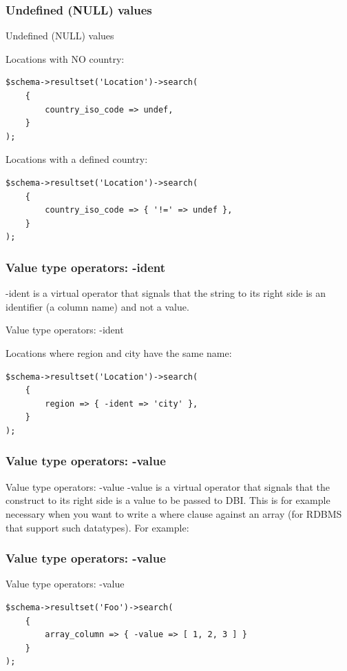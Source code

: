 \subsubsection{Undefined (NULL) values}
\begin{frame}[fragile]{Undefined (NULL) values}

Locations with NO country:

\begin{lstlisting}
$schema->resultset('Location')->search(
    {
        country_iso_code => undef,
    }
);
\end{lstlisting}

Locations with a defined country:

\begin{lstlisting}
$schema->resultset('Location')->search(
    {
        country_iso_code => { '!=' => undef },
    }
);
\end{lstlisting}
\end{frame}

\subsubsection{Value type operators: -ident}

-ident is a virtual operator that signals that the string to its right side
is an identifier (a column name) and not a value.

\begin{frame}[fragile]{Value type operators: -ident}

Locations where region and city have the same name:

\begin{lstlisting}
$schema->resultset('Location')->search(
    {
        region => { -ident => 'city' },
    }
);
\end{lstlisting}
\end{frame}

\subsubsection{Value type operators: -value}

Value type operators: -value
-value is a virtual operator that signals that the construct to its right
side is a value to be passed to DBI. This is for example necessary when you
want to write a where clause against an array (for RDBMS that support such
datatypes). For example:

\subsubsection{Value type operators: -value}
\begin{frame}[fragile]{Value type operators: -value}
\begin{lstlisting}
$schema->resultset('Foo')->search(
    {
        array_column => { -value => [ 1, 2, 3 ] }
    }
);
\end{lstlisting}
\end{frame}

